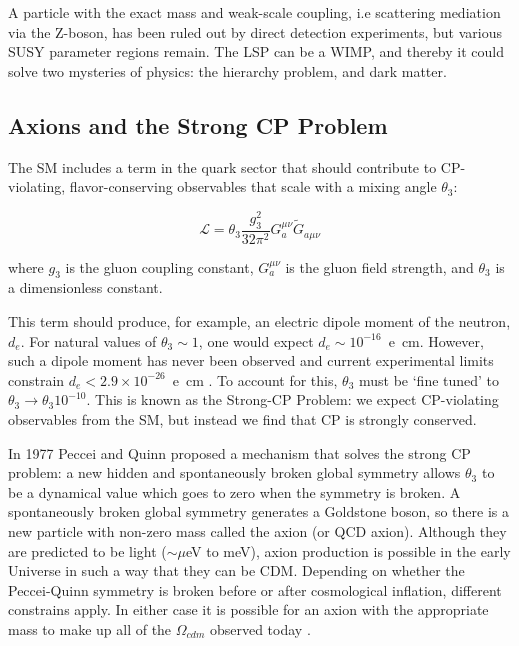 A particle with the exact mass and weak-scale coupling, i.e scattering mediation via the Z-boson, has been ruled out by direct detection experiments, but various \ac{SUSY} parameter regions remain. The \ac{LSP} can be a \ac{WIMP}, and thereby it could solve two mysteries of physics: the hierarchy problem, and dark matter. 

\subsection{Axions and the Strong CP Problem}
\label{sec:axion}
The \ac{SM} includes a term in the quark sector that should contribute to CP-violating, flavor-conserving observables that scale with a mixing angle $\theta_{3}$:

\begin{equation}
\mathcal{L} = \theta_{3} \frac{g_{3}^{2}}{32 \pi^{2}} G^{\mu \nu}_{a} \tilde{G}_{a \mu \nu}
\end{equation}

where $g_{3}$ is the gluon coupling constant, $G^{\mu \nu}_{a}$ is the gluon field strength, and $\theta_{3}$ is a dimensionless constant.

This term should produce, for example, an electric dipole moment of the neutron, $d_{e}$. For natural values of $\theta_{3} \sim 1$,  one would expect $d_{e} \sim10^{-16}$~e~cm. However, such a dipole moment has never been observed and current experimental limits constrain $d_{e} < 2.9 \times 10^{-26}$~e~cm \cite{Feng2010}. To account for this, $\theta_{3}$ must be `fine tuned' to $\theta_{3} \longrightarrow \theta_{3}10^{-10}$. This is known as the Strong-CP Problem: we expect CP-violating observables from the \ac{SM}, but instead we find that CP is strongly conserved.

In 1977 Peccei and Quinn proposed a mechanism that solves the strong CP problem: a new hidden and spontaneously broken global symmetry allows $\theta_{3}$ to be a dynamical value which goes to zero when the symmetry is broken. A spontaneously broken global symmetry generates a Goldstone boson, so there is a new particle with non-zero mass called the axion (or QCD axion). Although they are predicted to be light ($\sim \mu$eV to meV), axion production is possible in the early Universe in such a way that they can be \ac{CDM}. Depending on whether the Peccei-Quinn symmetry is broken before or after cosmological inflation, different constrains apply. In either case it is possible for an axion with the appropriate mass to make up all of the $\Omega_{cdm}$ observed today \cite{PDGAxions2017}.


